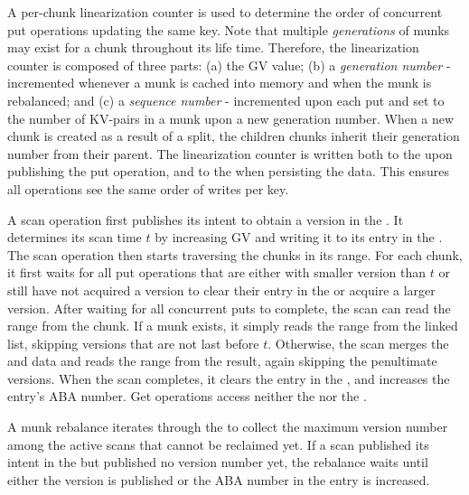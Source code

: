 {%
A per-chunk linearization counter is used to determine the order of concurrent put operations updating the same key.  
Note that multiple \emph{generations} of munks may exist for a chunk throughout its life time.
Therefore, the linearization counter is composed of three parts: (a) the GV value; (b) a \emph{generation number} - incremented whenever a munk is cached into memory and when the munk is rebalanced; and (c) a \emph{sequence number} - incremented upon each put and set to the number of KV-pairs in a munk upon a new generation number. When a new chunk is created as a result of a split, the children chunks inherit their generation number from their parent. The linearization counter is written both to the  upon publishing the put operation, and to the  when persisting the data. This ensures all operations see the same order of writes per key.

A scan operation first publishes its intent to obtain a version in the . It determines its scan time $t$ by increasing GV and writing it to its entry in the . The scan operation then starts traversing the chunks in its range. For each chunk, it first waits for all put operations that are either with smaller version than $t$ or still have not acquired a version to clear their entry in the  or acquire a larger version. After waiting for all concurrent puts to complete, the scan  can read the range from the chunk. If a munk exists, it simply reads the range from the linked list, skipping versions that are not last before $t$. Otherwise, the scan merges the  and  data and reads the range from the result, again skipping the penultimate versions. When the scan completes, it clears the entry in the , and increases the entry's ABA number. Get operations access neither the  nor the .%

A munk rebalance iterates through the  to collect the maximum version number among the active scans that cannot be reclaimed yet. If a scan published its intent in the  but published no version number yet, the rebalance waits until either the version is published or the ABA number in the entry is increased. 
}

